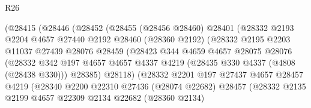 \begin{lexlean}{R26}
\begin{coremodule}
                        (@28415
                          (@28446
                            (@28452
                              (@28455
                                (@28456 @28460)
                                @28401
                                (@28332
                                  @2193
                                  @2204
                                  @4657
                                  @27440
                                  @2192
                                  @28460
                                  (@28360 @2192)
                                  (@28332
                                    @2195
                                    @2203
                                    @11037
                                    @27439
                                    @28076
                                    @28459
                                    (@28423
                                      @344
                                      @4659
                                      @4657
                                      @28075
                                      @28076
                                      (@28332
                                        @342
                                        @197
                                        @4657
                                        @4657
                                        @4337
                                        @4219
                                        (@28435 @330 @4337 (@4808 (@28438 @330)))
                                        @28385)
                                      @28118)
                                    (@28332
                                      @2201
                                      @197
                                      @27437
                                      @4657
                                      @28457
                                      @4219
                                      (@28340
                                        @2200
                                        @22310
                                        @27436
                                        (@28074 @22682)
                                        @28457
                                        (@28332
                                          @2135
                                          @2199
                                          @4657
                                          @22309
                                          @2134
                                          @22682
                                          (@28360 @2134)

\end{coremodule}
\end{lexlean}
